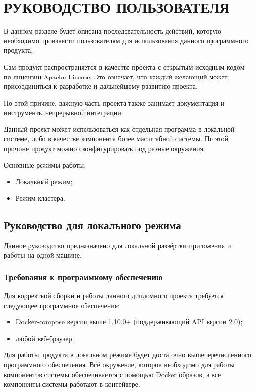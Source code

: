 \section{РУКОВОДСТВО ПОЛЬЗОВАТЕЛЯ}
\label{sec:manual}

\def\dc{Docker}

В данном разделе будет описана последовательность действий, которую необходимо произвести пользователям для использования данного программного продукта.

Сам продукт распространяется в качестве проекта с открытым исходным кодом по лицензии Apache License.
Это означает, что каждый желающий может присоединиться к разработке и дальнейшему развитию проекта.

По этой причине, важную часть проекта также занимает документация и инструменты непрерывной интеграции.

Данный проект может использоваться как отдельная программа в локальной системе, либо в качестве компонента более масштабной системы.
По этой причине продукт можно сконфигурировать под разные окружения.

Основные режимы работы:
\begin{itemize}
    \item Локальный режим;
    \item Режим кластера.
\end{itemize}

\subsection{Руководство для локального режима}

Данное руководство предназначено для локальной развёртки приложения и работы на одной машине.

\subsubsection{Требования к программному обеспечению}

Для корректной сборки и работы данного дипломного проекта требуется следующее программное обеспечение:
\begin{itemize}
    \item Docker-compose версии выше 1.10.0+ (поддерживающий API версии 2.0);
    \item любой веб-браузер.
\end{itemize}

Для работы продукта в локальном режиме будет достаточно вышеперечисленного программного обеспечения.
Всё окружение, которое необходимо для работы компонентов системы обеспечивается с помощью Docker образов, а все компоненты системы работают в контейнере.

